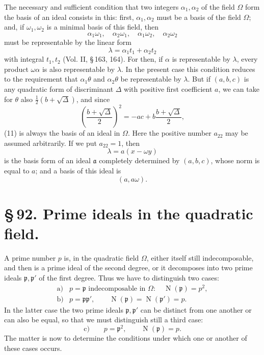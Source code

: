 \documentclass[11pt]{article}
\newcommand{\Norm}{\operatorname{N}}
\begin{document}
The necessary and sufficient condition that two integers $\alpha_1,\alpha_2$ of the field $\Omega$ form the basis of an ideal consists in this: first, $\alpha_1,\alpha_2$ must be a basis of the field $\Omega$; and, if $\omega_1,\omega_2$ is a minimal basis of this field, then
\[
 \alpha_1\omega_1,
 \quad \alpha_2\omega_1,
 \quad \alpha_1\omega_2,
 \quad \alpha_2\omega_2
\]
must be representable by the linear form
\[
 \lambda=\alpha_1t_1+\alpha_2t_2
\]
with integral $t_1,t_2$ (Vol. II, \S\,163, 164). For then, if $\alpha$ is representable by $\lambda$, every product $\omega\alpha$ is also representable by $\lambda$. In the present case this condition reduces to the requirement that $\alpha_1\theta$ and $\alpha_2\theta$ be representable by $\lambda$. But if $(a,b,c)$ is any quadratic form of discriminant $\Delta$ with positive first coefficient $a$, we can take for $\theta$ also $\frac12(b+\sqrt\Delta)$, and since
\[
 \left(\frac{b+\sqrt\Delta}{2}\right)^2
   =-ac+b\frac{b+\sqrt\Delta}{2},
\]
(11) is always the basis of an ideal in $\Omega$. Here the positive number $a_{22}$ may be assumed arbitrarily. If we put $a_{22}=1$, then
\begin{equation}
 \lambda=a(x-\omega y)
\tag{15}
\end{equation}
is the basis form of an ideal $\mathfrak a$ completely determined by $(a,b,c)$, whose norm is equal to $a$; and a basis of this ideal is
\begin{equation}
 (a,a\omega).
\tag{16}
\end{equation}

\section*{\S\,92. Prime ideals in the quadratic field.}

A prime number $p$ is, in the quadratic field $\Omega$, either itself still indecomposable, and then is a prime ideal of the second degree, or it decomposes into two prime ideals $\mathfrak p,\mathfrak p'$ of the first degree. Thus we have to distinguish two cases:
\[
\begin{array}{ll}
\text{a)}& p=\mathfrak p \text{ indecomposable in }\Omega: \quad \Norm(\mathfrak p)=p^2,\\[0.25em]
\text{b)}& p=\mathfrak p\mathfrak p',\qquad \Norm(\mathfrak p)=\Norm(\mathfrak p')=p.
\end{array}
\]
In the latter case the two prime ideals $\mathfrak p,\mathfrak p'$ can be distinct from one another or can also be equal, so that we must distinguish still a third case:
\[
\text{c)}\qquad p=\mathfrak p^2,\qquad \Norm(\mathfrak p)=p.
\]
The matter is now to determine the conditions under which one or another of these cases occurs.
\end{document}
